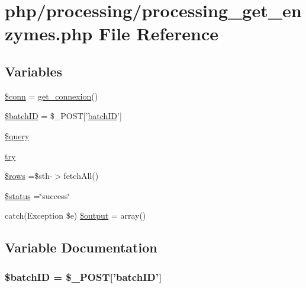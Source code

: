 \hypertarget{processing__get__enzymes_8php}{\section{php/processing/processing\-\_\-get\-\_\-enzymes.php File Reference}
\label{processing__get__enzymes_8php}
}
\subsection*{Variables}
\begin{DoxyCompactItemize}
\item 
\hyperlink{processing__get__enzymes_8php_aa8a5a87b9c1a6a0819b88447cbe41877}{\$conn} = \hyperlink{php__functions_8php_ace18bc10f3fd08f92688ac743e0d8c2e}{get\-\_\-connexion}()
\item 
\hyperlink{processing__get__enzymes_8php_aaa6d122ea9cb55b210aadd86e5654a74}{\$batch\-I\-D} = \$\-\_\-\-P\-O\-S\-T\mbox{[}'\hyperlink{obsolete_2processing__bak_8php_a88c5bc4262b7c34f236357f5c53fc99b}{batch\-I\-D}'\mbox{]}
\item 
\hyperlink{processing__get__enzymes_8php_af59a5f7cd609e592c41dc3643efd3c98}{\$query}
\item 
\hyperlink{processing__get__enzymes_8php_abe4cc9788f52e49485473dc699537388}{try}
\item 
\hyperlink{processing__get__enzymes_8php_ace2ec39e7df3899fa8df9640ec274b03}{\$rows} =\$sth-\/$>$fetch\-All()
\item 
\hyperlink{processing__get__enzymes_8php_a58391ea75f2d29d5d708d7050b641c33}{\$status} =\char`\"{}success\char`\"{}
\item 
catch(Exception \$e) \hyperlink{processing__get__enzymes_8php_adeea971a3fd99fcce189bd638dacd58c}{\$output} = array()
\end{DoxyCompactItemize}


\subsection{Variable Documentation}
\hypertarget{processing__get__enzymes_8php_aaa6d122ea9cb55b210aadd86e5654a74}{
\subsubsection[{\$batch\-I\-D}]{\setlength{\rightskip}{0pt plus 5cm}\${\bf batch\-I\-D} = \$\-\_\-\-P\-O\-S\-T\mbox{[}'{\bf batch\-I\-D}'\mbox{]}}}\label{processing__get__enzymes_8php_aaa6d122ea9cb55b210aadd86e5654a74}


